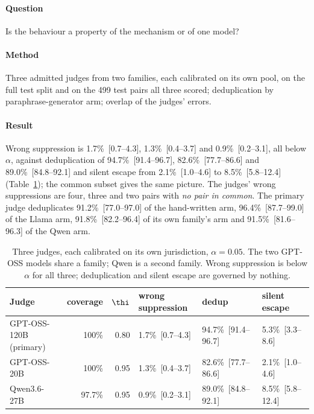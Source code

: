 \paragraph{Question} Is the behaviour a property of the mechanism or of one model?

\paragraph{Method} Three admitted judges from two families, each calibrated on its own pool, on the full test split and on the 499 test pairs all three scored; deduplication by paraphrase-generator arm; overlap of the judges' errors.

\paragraph{Result} Wrong suppression is 1.7\%~[0.7--4.3], 1.3\%~[0.4--3.7] and 0.9\%~[0.2--3.1], all below $\alpha$, against deduplication of 94.7\%~[91.4--96.7], 82.6\%~[77.7--86.6] and 89.0\%~[84.8--92.1] and silent escape from 2.1\%~[1.0--4.6] to 8.5\%~[5.8--12.4] (Table~\ref{tab:judges}); the common subset gives the same picture. The judges' wrong suppressions are four, three and two pairs with \emph{no pair in common}. The primary judge deduplicates 91.2\%~[77.0--97.0] of the hand-written arm, 96.4\%~[87.7--99.0] of the Llama arm, 91.8\%~[82.2--96.4] of its own family's arm and 91.5\%~[81.6--96.3] of the Qwen arm.

\begin{table}[!tbp]
\centering\scriptsize\setlength{\tabcolsep}{3.5pt}
\caption{Three judges, each calibrated on its own jurisdiction, $\alpha=0.05$. The two GPT-OSS models share a family; Qwen is a second family. Wrong suppression is below $\alpha$ for all three; deduplication and silent escape are governed by nothing.}\label{tab:judges}
\begin{tabular}{@{}lrrlll@{}}
\toprule
Judge & coverage & $\thi$ & wrong suppression & dedup & silent escape \\
\midrule
GPT-OSS-120B (primary) & 100\% & 0.80 & 1.7\%~[0.7--4.3] & 94.7\%~[91.4--96.7] & 5.3\%~[3.3--8.6] \\
GPT-OSS-20B & 100\% & 0.95 & 1.3\%~[0.4--3.7] & 82.6\%~[77.7--86.6] & 2.1\%~[1.0--4.6] \\
Qwen3.6-27B & 97.7\% & 0.95 & 0.9\%~[0.2--3.1] & 89.0\%~[84.8--92.1] & 8.5\%~[5.8--12.4] \\
\bottomrule
\end{tabular}
\end{table}

